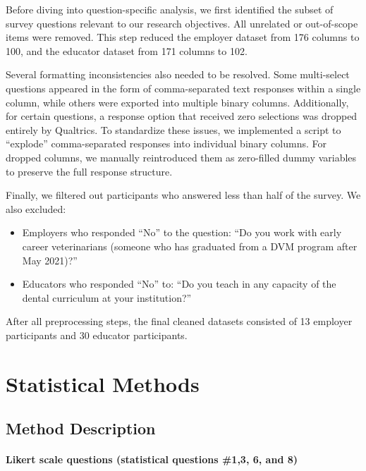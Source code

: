 \documentclass[
  11pt,
  letterpaper,
  DIV=11,
  numbers=noendperiod]{scrartcl}
\let\oldparagraph\paragraph
\renewcommand{\paragraph}[1]{\oldparagraph{#1}\mbox{}}
\numberwithin{figure}{section}
\begin{document}
Before diving into question-specific analysis, we first identified the
subset of survey questions relevant to our research objectives. All
unrelated or out-of-scope items were removed. This step reduced the
employer dataset from 176 columns to 100, and the educator dataset from
171 columns to 102.

Several formatting inconsistencies also needed to be resolved. Some
multi-select questions appeared in the form of comma-separated text
responses within a single column, while others were exported into
multiple binary columns. Additionally, for certain questions, a response
option that received zero selections was dropped entirely by Qualtrics.
To standardize these issues, we implemented a script to ``explode''
comma-separated responses into individual binary columns. For dropped
columns, we manually reintroduced them as zero-filled dummy variables to
preserve the full response structure.

Finally, we filtered out participants who answered less than half of the
survey. We also excluded:

\begin{itemize}
\item
  Employers who responded ``No'' to the question: ``Do you work with
  early career veterinarians (someone who has graduated from a DVM
  program after May 2021)?''
\item
  Educators who responded ``No'' to: ``Do you teach in any capacity of
  the dental curriculum at your institution?''
\end{itemize}

After all preprocessing steps, the final cleaned datasets consisted of
13 employer participants and 30 educator participants.

\hypertarget{statistical-methods}{%
\section{Statistical Methods}\label{statistical-methods}}

\hypertarget{method-description}{%
\subsection{Method Description}\label{method-description}}

\hypertarget{likert-scale-questions-statistical-questions-13-6-and-8}{%
\paragraph{Likert scale questions (statistical questions \#1,3, 6, and
8)}\label{likert-scale-questions-statistical-questions-13-6-and-8}}
\end{document}
